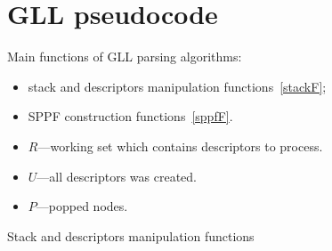 \appendix

\section{GLL pseudocode}\label{GLLCode}

Main functions of GLL parsing algorithms: 
\begin{itemize}
\item stack and descriptors manipulation functions~\ref{stackF};
\item SPPF construction functions~\ref{sppfF}.
\end{itemize}

\begin{itemize}
\item $R$---working set which contains descriptors to process.
\item $U$---all descriptors was created.
\item $P$---popped nodes.
\end{itemize}


\begin{algorithm}
\begin{algorithmic}[1]
\caption{Stack and descriptors manipulation functions}
\label{stackF}
  \EndIf
\EndFunction

      \EndFor
  \EndIf
\EndFunction

  \EndIf
      \EndFor
  \EndIf
\EndFunction

\end{algorithmic}
\end{algorithm}


